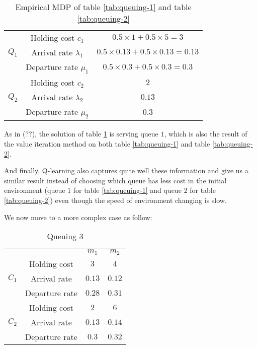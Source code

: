 \documentclass[
  a4paper, xcolor = usenames,dvipsnames]{article}
\theoremstyle{definition}
\theoremstyle{definition}
\theoremstyle{definition}
\theoremstyle{definition}
\theoremstyle{remark}
\begin{document}
\begin{table}[!htbp]
\caption{Empirical MDP of table \ref{tab:queuing-1} and table \ref{tab:queuing-2}}
\begin{center}
\begin{tabular}{c c c}
    \hline
    \multirow{3}{*}{$Q_{1}$} & Holding cost $c_{1}$ & $0.5 \times 1 + 0.5 \times 5 = 3$ \\
    & Arrival rate $\lambda_{1}$ & $0.5 \times 0.13 + 0.5 \times 0.13 = 0.13$ \\
    & Departure rate $\mu_{1}$ & $0.5 \times 0.3 + 0.5 \times 0.3 = 0.3$ \\
    \cline{2-3}
    \multirow{3}{*}{$Q_{2}$} & Holding cost $c_{2}$ & $2$ \\
    & Arrival rate $\lambda_{2}$ & $0.13$ \\
    & Departure rate $\mu_{2}$ & $0.3$ \\    
    \hline
\end{tabular}
\end{center}
\label{tab:mdp-queuing-1}
\end{table}

As in (??), the solution of table \ref{tab:mdp-queuing-1} is serving queue \(1\), which is also the result of the value iteration method on both table \ref{tab:queuing-1} and table \ref{tab:queuing-2}.

And finally, Q-learning also captures quite well these information and give us a similar result instead of choosing which queue has less cost in the initial environment (queue \(1\) for table \ref{tab:queuing-1} and queue \(2\) for table \ref{tab:queuing-2}) even though the speed of environment changing is slow.

We now move to a more complex case as follow:

\begin{table}[!htbp]
\caption{Queuing 3}
\begin{center}
\begin{tabular}{c c c c}
    \hline
    \multicolumn{2}{c}{} & $m_{1}$ & $m_{2}$ \\
    \cline{2-4}
    \multirow{3}{*}{$C_{1}$} & Holding cost & $3$ & $4$ \\
    & Arrival rate & $0.13$ & $0.12$ \\
    & Departure rate & $0.28$ & $0.31$ \\
    \cline{2-4}
    \multirow{3}{*}{$C_{2}$} & Holding cost & $2$ & $6$ \\
    & Arrival rate & $0.13$ & $0.14$ \\
    & Departure rate & $0.3$ & $0.32$ \\    
    \hline
\end{tabular}
\label{tab:queuing-3}
\end{center}
\end{table}
\end{document}

